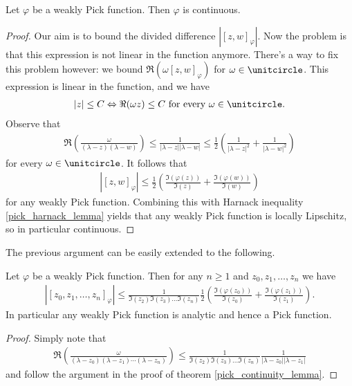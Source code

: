 \begin{lause}\label{pick_continuity_lemma}
	Let $\varphi$ be a weakly Pick function. Then $\varphi$ is continuous.
\end{lause}
\begin{proof}
	Our aim is to bound the divided difference $|[z, w]_{\varphi}|$. Now the problem is that this expression is not linear in the function anymore. There's a way to fix this problem however: we bound $\Re(\omega [z, w]_{\varphi})$ for $\omega \in \unitcircle$. This expression is linear in the function, and we have
	\begin{align*}
		|z| \leq C \Leftrightarrow \Re(\omega z) \leq C \text{ for every $\omega \in \unitcircle$}.
	\end{align*}
	Observe that
	\begin{align*}
		\Re\left(\frac{\omega}{(\lambda - z)(\lambda - w)} \right) \leq \frac{1}{|\lambda - z||\lambda - w|} \leq \frac{1}{2} \left( \frac{1}{|\lambda - z|^2} + \frac{1}{|\lambda - w|^2}\right)
	\end{align*}
	for every $\omega \in \unitcircle$. It follows that
	\begin{align*}
		|[z, w]_{\varphi}| \leq \frac{1}{2} \left(\frac{\Im(\varphi(z))}{\Im(z)} + \frac{\Im(\varphi(w))}{\Im(w)}\right)
	\end{align*}
	for any weakly Pick function. Combining this with Harnack inequality \ref{pick_harnack_lemma} yields that any weakly Pick function is locally Lipschitz, so in particular continuous.
\end{proof}

The previous argument can be easily extended to the following.

\begin{lause}\label{Hindmarsh_theorem}
	Let $\varphi$ be a weakly Pick function. Then for any $n \geq 1$ and $z_{0}, z_{1}, \ldots, z_{n}$ we have
	\begin{align*}
		|[z_{0}, z_{1}, \ldots, z_{n}]_{\varphi}| \leq \frac{1}{\Im(z_{2}) \Im(z_{3}) \ldots \Im(z_{n})} \frac{1}{2}\left(\frac{\Im(\varphi(z_{0}))}{\Im(z_{0})} + \frac{\Im(\varphi(z_{1}))}{\Im(z_{1})}\right).
	\end{align*}
	In particular any weakly Pick function is analytic and hence a Pick function.
\end{lause}
\begin{proof}
	Simply note that
	\begin{align*}
		\Re\left(\frac{\omega}{(\lambda - z_{0})(\lambda - z_{1}) \cdots (\lambda - z_{n})} \right) \leq \frac{1}{\Im(z_{2}) \Im(z_{3}) \ldots \Im(z_{n})} \frac{1}{|\lambda - z_{0}||\lambda - z_{1}|}
	\end{align*}
	and follow the argument in the proof of theorem \ref{pick_continuity_lemma}.
\end{proof}

